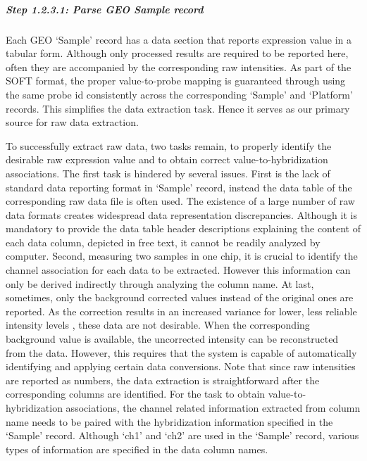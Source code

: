 \subparagraph{\textit{Step 1.2.3.1: Parse GEO Sample record}}
Each GEO `Sample' record has a data section that reports expression value in a tabular form. Although only processed results are required to be reported here, often they are accompanied by the corresponding raw intensities. As part of the SOFT format, the proper value-to-probe mapping is guaranteed through using the same probe id consistently across the corresponding `Sample' and `Platform' records. This simplifies the data extraction task.  Hence it serves as our primary source for raw data extraction.

To successfully extract raw data, two tasks remain, to properly identify the desirable raw expression value and to obtain correct value-to-hybridization associations. The first task is hindered by several issues.  First is the lack of standard data reporting format in `Sample' record, instead the data table of the corresponding raw data file is often used. The existence of a large number of raw data formats creates widespread data representation discrepancies. Although it is mandatory to provide the data table header descriptions explaining the content of each data column, depicted in free text, it cannot be readily analyzed by computer. Second, measuring two samples in one chip, it is crucial to identify the channel association for each data to be extracted.  However this information can only be derived indirectly through analyzing the column name. At last, sometimes, only the background corrected values instead of the original ones are reported.  As the correction results in an increased variance for lower, less reliable intensity levels \cite{Ritchie2007}, these data are not desirable. When the corresponding background value is available, the uncorrected intensity can be reconstructed from the data.  However, this requires that the system is capable of automatically identifying and applying certain data conversions. Note that since raw intensities are reported as numbers, the data extraction is straightforward after the corresponding columns are identified. For the task to obtain value-to-hybridization associations, the channel related information extracted from column name needs to be paired with the hybridization information specified in the `Sample' record. Although `ch1' and `ch2' are used in the `Sample' record, various types of information are specified in the data column names.
 
